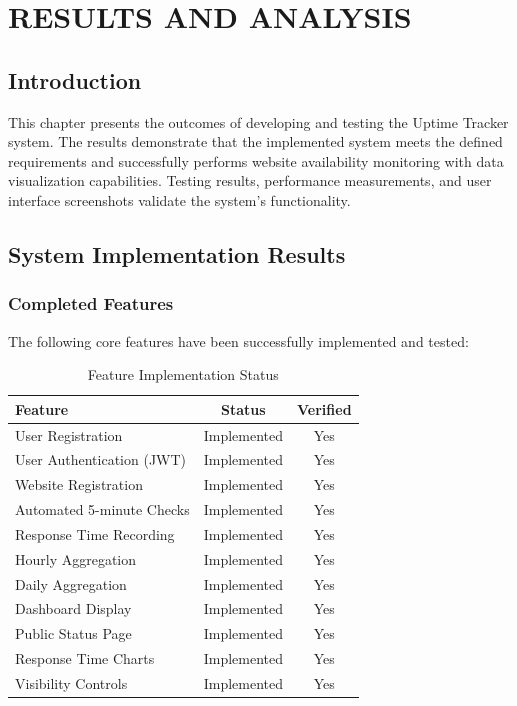 \chapter{RESULTS AND ANALYSIS}

\section{Introduction}

This chapter presents the outcomes of developing and testing the Uptime Tracker system. The results demonstrate that the implemented system meets the defined requirements and successfully performs website availability monitoring with data visualization capabilities. Testing results, performance measurements, and user interface screenshots validate the system's functionality.

\section{System Implementation Results}

\subsection{Completed Features}

The following core features have been successfully implemented and tested:

\begin{table}[htbp]
    \centering
    \caption{Feature Implementation Status}
    \label{tab:feature-status}
    \begin{tabular}{lcc}
        \toprule
        \textbf{Feature} & \textbf{Status} & \textbf{Verified} \\
        \midrule
        User Registration & Implemented & Yes \\
        User Authentication (JWT) & Implemented & Yes \\
        Website Registration & Implemented & Yes \\
        Automated 5-minute Checks & Implemented & Yes \\
        Response Time Recording & Implemented & Yes \\
        Hourly Aggregation & Implemented & Yes \\
        Daily Aggregation & Implemented & Yes \\
        Dashboard Display & Implemented & Yes \\
        Public Status Page & Implemented & Yes \\
        Response Time Charts & Implemented & Yes \\
        Visibility Controls & Implemented & Yes \\
        \bottomrule
    \end{tabular}
\end{table}


